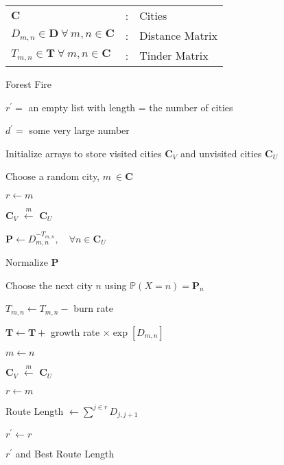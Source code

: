 \documentclass{minimal}
\begin{document}
	
\begin{tabular}{ p{4cm} p{0.5cm} l }
	\(\mathbf{C}\) &:& Cities \\
	\({D_{m,n}} \in \mathbf{D}\ \forall\ m,n \in \mathbf{C}\) &:& Distance Matrix \\
	\({T_{m,n}} \in \mathbf{T}\ \forall\ m,n \in \mathbf{C}\) &:& Tinder Matrix \\
\end{tabular}

\vspace{4em}


\begin{algorithm}
\caption{Forest Fire}
\label{alg:forest_fire}
\begin{algorithmic}

	
	\(r^\prime = \) an empty list with length = the number of cities 

	\(d^\prime = \) some very large number

	
		Initialize arrays to store visited cities \(\mathbf{C}_V\) and unvisited cities \(\mathbf{C}_U\)
		
		Choose a random city, \(m \ \in \mathbf{C}\)
		
		\(r \gets m\)

		\(\mathbf{C}_V\) \(\overset{m}{\leftarrow}\) \(\mathbf{C}_U\)
		
			\State \(\mathbf P\gets  D_{m,n}^{-T_{m,n}}, \quad\forall n \in\mathbf{C}_U\)
			
			\State Normalize \(\mathbf{P}\)
			
			\State Choose the next city \(n\) using \( \mathbb P(X=n) = \mathbf{P}_n \)

			\State \(T_{m,n} \gets T_{m,n} - \) burn rate
			
			\State \(\mathbf{T} \gets \mathbf{T} + \) growth rate \(\times \exp[D_{m,n}]\)
			
			\State \(m \gets n\)
			
			\State \(\mathbf{C}_V\) \(\overset{m}{\leftarrow}\) \(\mathbf{C}_U\)
			
			\State \(r \gets m\)
		\EndWhile
		
\color{black}

		\State Route Length \(\gets \sum_{}^{j\in r} D_{j,j+1} \)
		
			\State \(r^\prime \gets r\)
		\EndIf
		
		\Return \(r^\prime\) and Best Route Length

	\EndFor
	\EndProcedure

\color{lightgray}		
		
\end{algorithmic}
\end{algorithm}
\end{document}
